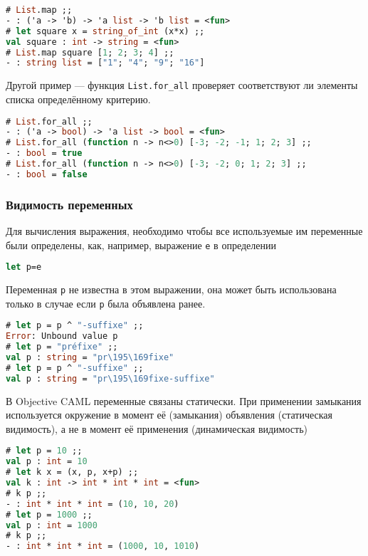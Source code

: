 \begin{lstlisting}[language=OCaml]
# List.map ;;
- : ('a -> 'b) -> 'a list -> 'b list = <fun>
# let square x = string_of_int (x*x) ;;
val square : int -> string = <fun>
# List.map square [1; 2; 3; 4] ;;
- : string list = ["1"; "4"; "9"; "16"]
\end{lstlisting}

Другой пример --- функция \texttt{List.for\_all} проверяет соответствуют ли
элементы списка определённому критерию.

\begin{lstlisting}[language=OCaml]
# List.for_all ;;
- : ('a -> bool) -> 'a list -> bool = <fun>
# List.for_all (function n -> n<>0) [-3; -2; -1; 1; 2; 3] ;;
- : bool = true
# List.for_all (function n -> n<>0) [-3; -2; 0; 1; 2; 3] ;;
- : bool = false
\end{lstlisting}

\subsubsection{Видимость переменных}

Для вычисления выражения, необходимо чтобы все используемые им переменные были
определены, как, например, выражение \texttt{e} в определении

\begin{lstlisting}[language=OCaml]
let p=e
\end{lstlisting}

Переменная \texttt{p} не известна в этом выражении, она может быть использована
только в случае если \texttt{p} была объявлена ранее.

\begin{lstlisting}[language=OCaml]
# let p = p ^ "-suffixe" ;;
Error: Unbound value p
# let p = "préfixe" ;;
val p : string = "pr\195\169fixe"
# let p = p ^ "-suffixe" ;;
val p : string = "pr\195\169fixe-suffixe"
\end{lstlisting}

В Objective CAML переменные связаны статически. При применении замыкания
используется окружение в момент её (замыкания) объявления (статическая
видимость), а не в момент её применения (динамическая видимость)

\begin{lstlisting}[language=OCaml]
# let p = 10 ;;
val p : int = 10
# let k x = (x, p, x+p) ;;
val k : int -> int * int * int = <fun>
# k p ;;
- : int * int * int = (10, 10, 20)
# let p = 1000 ;;
val p : int = 1000
# k p ;;
- : int * int * int = (1000, 10, 1010)
\end{lstlisting}

